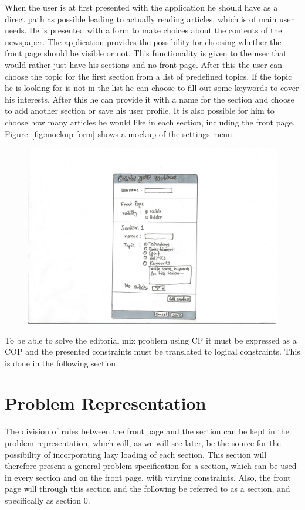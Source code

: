 When the user is at first presented with the application he should have as a direct path as possible leading to actually reading articles, which is of main user needs. He is presented with a form to make choices about the contents of the newspaper. The application provides the possibility for choosing whether the front page should be visible or not. This functionality is given to the user that would rather just have his sections and no front page. After this the user can choose the topic for the first section from a list of predefined topics. If the topic he is looking for is not in the list he can choose to fill out some keywords to cover his interests. After this he can provide it with a name for the section and choose to add another section or save his user profile. It is also possible for him to choose how many articles he would like in each section, including the front page. Figure~\vref{fig:mockup-form} shows a mockup of the settings menu.
\begin{figure}[h!tp]
	\myfloatalign
		\includegraphics[width=.45\textwidth]{img/mockup-form}
\end{figure}

To be able to solve the editorial mix problem using CP it must be expressed as a COP and the presented constraints must be translated to logical constraints. This is done in the following section.

\section{Problem Representation}
The division of rules between the front page and the section can be kept in the problem representation, which will, as we will see later, be the source for the possibility of incorporating lazy loading of each section. This section will therefore present a general problem specification for a section, which can be used in every section and on the front page, with varying constraints. Also, the front page will through this section and the following be referred to as a section, and specifically as section $0$.

